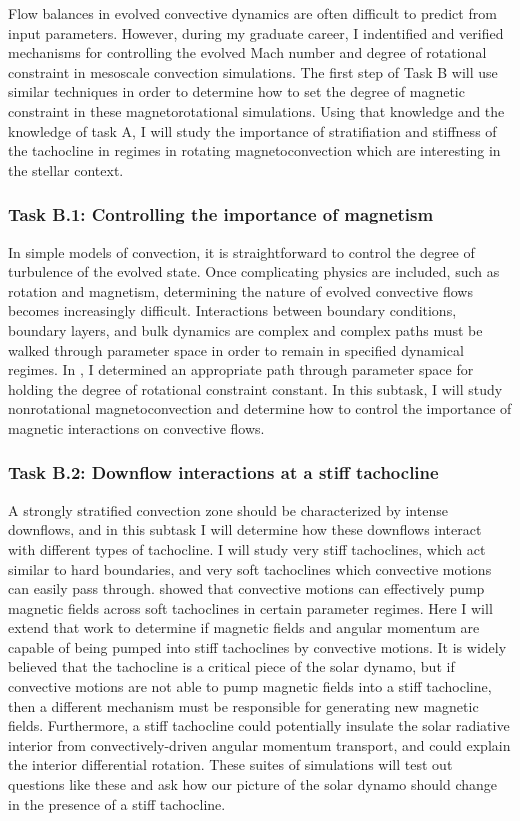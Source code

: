 \documentclass[aasms,11pt]{article}
\begin{document}
Flow balances in evolved convective dynamics are often difficult to predict from input parameters.
However, during my graduate career, I indentified and verified mechanisms for controlling the evolved Mach number \citep{anders&brown2017} and degree of rotational constraint \citep[][and Fig. \ref{fig:rossby_plot}]{anders&all2019} in mesoscale convection simulations.
The first step of Task B will use similar techniques in order to determine how to set the degree of magnetic constraint in these magnetorotational simulations.
Using that knowledge and the knowledge of task A, I will study the importance of stratifiation and stiffness of the tachocline in regimes in rotating magnetoconvection which are interesting in the stellar context.

\subsubsection{Task B.1: Controlling the importance of magnetism}
In simple models of convection, it is straightforward to control the degree of turbulence of the evolved state.
Once complicating physics are included, such as rotation and magnetism, determining the nature of evolved convective flows becomes increasingly difficult.
Interactions between boundary conditions, boundary layers, and bulk dynamics are complex and complex paths must be walked through parameter space in order to remain in specified dynamical regimes.
In \citet{anders&all2019}, I determined an appropriate path through parameter space for holding the degree of rotational constraint constant.
In this subtask, I will study nonrotational magnetoconvection and determine how to control the importance of magnetic interactions on convective flows.

\subsubsection{Task B.2: Downflow interactions at a stiff tachocline}
A strongly stratified convection zone should be characterized by intense downflows, and in this subtask I will determine how these downflows interact with different types of tachocline.
I will study very stiff tachoclines, which act similar to hard boundaries, and very soft tachoclines which convective motions can easily pass through.
\citet{tobias&all1998} showed that convective motions can effectively pump magnetic fields across soft tachoclines in certain parameter regimes.
Here I will extend that work  to determine if magnetic fields and angular momentum are capable of being pumped into stiff tachoclines by convective motions.
It is widely believed that the tachocline is a critical piece of the solar dynamo, but if convective motions are not able to pump magnetic fields into a stiff tachocline, then a different mechanism must be responsible for generating new magnetic fields.
Furthermore, a stiff tachocline could potentially insulate the solar radiative interior from convectively-driven angular momentum transport, and could explain the interior differential rotation.
These suites of simulations will test out questions like these and ask how our picture of the solar dynamo should change in the presence of a stiff tachocline.
\end{document}

